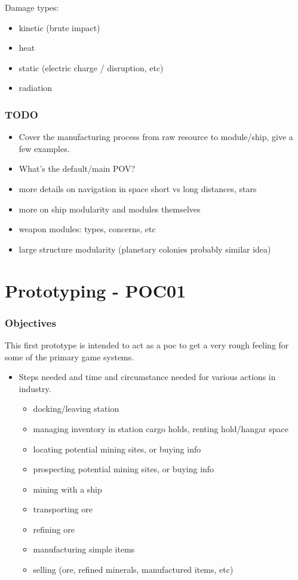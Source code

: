 \documentclass[a4paper,10pt]{article}
\begin{document}
Damage types:
\begin{itemize}
\item kinetic (brute impact)
\item heat
\item static (electric charge / disruption, etc)
\item radiation
\end{itemize}


\section{TODO}
\begin{itemize}
\item Cover the manufacturing process from raw resource to module/ship, give a
  few examples.
\item What's the default/main POV?
\item more details on navigation in space short vs long distances, stars
\item more on ship modularity and modules themselves
\item weapon modules: types, concerns, etc
\item large structure modularity (planetary colonies probably similar idea)
\end{itemize}

\part{Prototyping - POC01}

\section{Objectives}
\begin{multicols}{2}
This first prototype is intended to act as a poc to get a very rough feeling
for some of the primary game systems.

\begin{itemize}
\item Steps needed and time and circumstance needed for various actions in
  industry.
  \begin{itemize}
  \item docking/leaving station
  \item managing inventory in station cargo holds, renting hold/hangar space
  \item locating potential mining sites, or buying info
  \item prospecting potential mining sites, or buying info
  \item mining with a ship
  \item transporting ore
  \item refining ore
  \item manufacturing simple items
  \item selling (ore, refined minerals, manufactured items, etc)
  \end{itemize}
\end{itemize}
\end{multicols}
\end{document}
